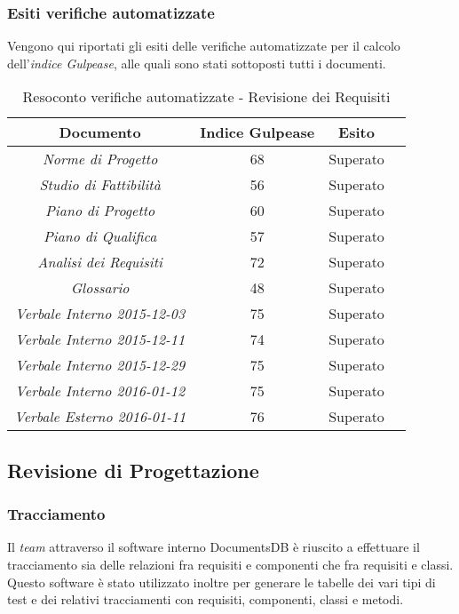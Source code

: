 \subsubsection{Esiti verifiche automatizzate}
Vengono qui riportati gli esiti delle verifiche automatizzate per il calcolo dell'\textit{indice Gulpease}, alle quali sono stati sottoposti tutti i documenti.
\begin{table}[h]
\begin{center}
\begin{tabular}{|c|c|c|c|}
\hline \textbf{Documento} & \textbf{Indice Gulpease} & \textbf{Esito}\\
\hline
\emph{Norme di Progetto} & 68 & Superato \\
\emph{Studio di Fattibilità} & 56 & Superato \\
\emph{Piano di Progetto} & 60 & Superato \\
\emph{Piano di Qualifica} & 57  & Superato \\
\emph{Analisi dei Requisiti} & 72 & Superato \\
\emph{Glossario} & 48 & Superato \\
\emph{Verbale Interno 2015-12-03} & 75 & Superato \\
\emph{Verbale Interno 2015-12-11} & 74 & Superato \\
\emph{Verbale Interno 2015-12-29} & 75 & Superato \\
\emph{Verbale Interno 2016-01-12} & 75 & Superato \\
\emph{Verbale Esterno 2016-01-11} & 76 & Superato \\
\hline
\end{tabular}
\caption{Resoconto verifiche automatizzate - Revisione dei Requisiti}
\end{center}
\end{table}

\subsection{Revisione di Progettazione}

\subsubsection{Tracciamento}
Il \textit{team} attraverso il software interno DocumentsDB è riuscito a effettuare il tracciamento sia delle relazioni fra requisiti e componenti che fra requisiti e classi. Questo software è stato utilizzato inoltre per generare le tabelle dei vari tipi di test e dei relativi tracciamenti con requisiti, componenti, classi e metodi.

